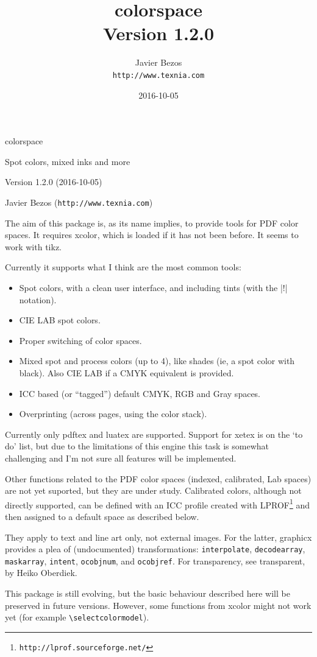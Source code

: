 \documentclass[a4paper]{ltxguide}
\title{\textsf{colorspace}\\\large Version 1.2.0}
\author{Javier Bezos\\\texttt{http://www.texnia.com}}
\date{2016-10-05}
\begin{document}
{\fontsize{48}{48}\selectfont colorspace\par}
{\LARGE Spot colors, mixed inks and more\par}
\vspace*{1ex}
Version 1.2.0 (2016-10-05)\par
Javier Bezos (\texttt{http://www.texnia.com})

\vspace*{6ex}

The aim of this package is, as its name implies, to provide tools for
PDF color spaces. It requires \textsf{xcolor}, which is loaded if it
has not been before. It seems to work with \textsf{tikz}.

Currently it supports what I think are the most common tools:
\begin{itemize}
\item Spot colors, with a clean user interface, and including tints
  (with the |!| notation).
\item CIE LAB spot colors.
\item Proper switching of color spaces.
\item Mixed spot and process colors (up to 4), like shades (ie, a spot
  color with black). Also CIE LAB if a CMYK equivalent is provided.
\item ICC based (or ``tagged'') default CMYK, RGB and Gray spaces.
\item Overprinting (across pages, using the color stack).
\end{itemize}
Currently only \textsf{pdftex} and \textsf{luatex} are
supported. Support for \textsf{xetex} is on the `to do' list, but due
to the limitations of this engine this task is somewhat challenging
and I'm not sure all features will be implemented.

Other functions related to the PDF color spaces (indexed, calibrated,
Lab spaces) are not yet suported, but they are under study. Calibrated
colors, although not directly supported, can be defined with an ICC
profile created with
LPROF\footnote{\texttt{http://lprof.sourceforge.net/}} and then
assigned to a default space as described below.

They apply to text and line art only, not external images. For the
latter, \textsf{graphicx} provides a plea of (undocumented)
transformations: \texttt{interpolate}, \texttt{decodearray},
\texttt{maskarray}, \texttt{intent}, \texttt{ocobjnum}, and
\texttt{ocobjref}. For transparency, see \textsf{transparent}, by
Heiko Oberdiek.

This package is still evolving, but the basic behaviour described here
will be preserved in future versions. However, some functions from
\textsf{xcolor} might not work yet (for example \verb|\selectcolormodel|).
\end{document}
